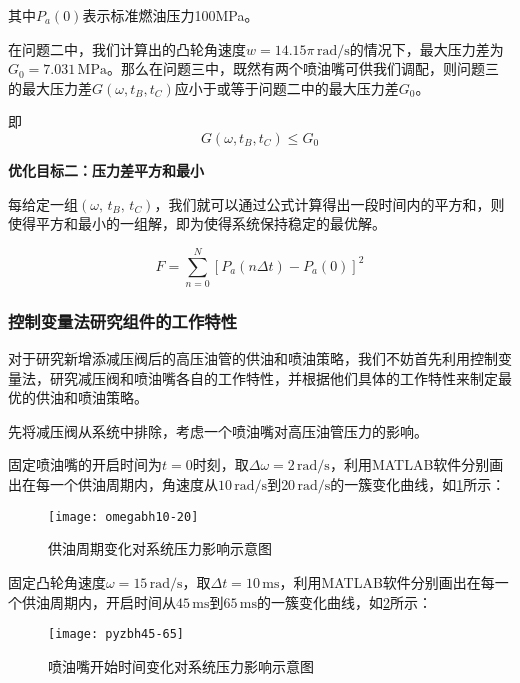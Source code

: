 \documentclass[withoutpreface,bwprint]{cumcmthesis} %
\begin{document}
其中$P_{a}(0)$表示标准燃油压力100MPa。

在问题二中，我们计算出的凸轮角速度$w=14.15\pi\, \text{rad/s}$的情况下，最大压力差为$G_{0}=7.031\,\text{MPa}$。那么在问题三中，既然有两个喷油嘴可供我们调配，则问题三的最大压力差$G(\omega,t_{B},t_{C})$应小于或等于问题二中的最大压力差$G_{0}$。

即
\begin{equation}
G(\omega,t_{B},t_{C}) \le G_{0}
\end{equation}

\textbf{优化目标二：压力差平方和最小}

每给定一组$(\omega,\,t_{B},\,t_{C})$，我们就可以通过公式计算得出一段时间内的平方和，则使得平方和最小的一组解，即为使得系统保持稳定的最优解。

\begin{equation} 
F=\sum_{n=0}^{N}[P_a(n\Delta t)-P_a(0)]^2
\end{equation}


\subsubsection{控制变量法研究组件的工作特性}

对于研究新增添减压阀后的高压油管的供油和喷油策略，我们不妨首先利用控制变量法，研究减压阀和喷油嘴各自的工作特性，并根据他们具体的工作特性来制定最优的供油和喷油策略。

先将减压阀从系统中排除，考虑一个喷油嘴对高压油管压力的影响。
\clearpage

固定喷油嘴的开启时间为$t=0$时刻，取$\Delta \omega=2\,\text{rad/s}$，利用MATLAB软件分别画出在每一个供油周期内，角速度从$10\,\text{rad/s}$到$20\,\text{rad/s}$的一簇变化曲线，如\cref{fig:omegabh10-20}所示：

\begin{figure}[!h]
	\centering
	\texttt{[image: omegabh10-20]}
	\caption{供油周期变化对系统压力影响示意图}
	\label{fig:omegabh10-20}
\end{figure}


固定凸轮角速度$\omega =15\,\text{rad/s}$，取$\Delta t=10\,\text{ms}$，利用MATLAB软件分别画出在每一个供油周期内，开启时间从$45\, \text{ms}$到$65 \, \text{ms}$的一簇变化曲线，如\cref{fig:pyzbh45-65}所示：


\begin{figure}[!h]
	\centering
	\texttt{[image: pyzbh45-65]}
	\caption{喷油嘴开始时间变化对系统压力影响示意图}
	\label{fig:pyzbh45-65}
\end{figure}
\end{document}
